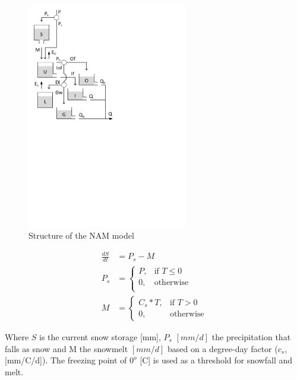 { 																	%
\begin{figure}
\includegraphics[trim=1cm 14cm 7cm 1cm,width=7cm,keepaspectratio]{./files/41_schematic.pdf}
\caption{Structure of the NAM model} \label{fig:41_schematic}
\end{figure}

\begin{align}
	\frac{dS}{dt} &= P_s-M \\
	P_s &= \begin{cases}
		P, &\text{if } T \leq 0 \\
		0, & \text{otherwise} \\
	\end{cases} \\
	M &= 
	\begin{cases}
		C_s*T, & \text{if } T > 0 \\
		0, & \text{otherwise}
	\end{cases}
\end{align}

Where $S$ is the current snow storage [mm], $P_s$ $[mm/d]$ the precipitation that falls as snow and M the snowmelt $[mm/d]$ based on a degree-day factor ($c_s$, [mm/\degree C/d]). The freezing point of $0^o$ [C] is used as a threshold for snowfall and melt.

} %

